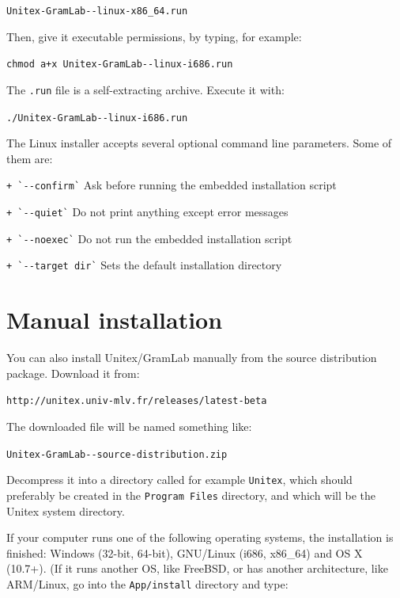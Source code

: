 {\tt Unitex-GramLab-\UnitexVersion{}-linux-x86\_64.run}

\noindent Then, give it executable permissions, by typing, for example:

{\tt chmod a+x Unitex-GramLab-\UnitexVersion{}-linux-i686.run}

\noindent The \verb+.run+ file is a self-extracting archive. Execute it with:

{\tt ./Unitex-GramLab-\UnitexVersion{}-linux-i686.run}

\noindent The Linux installer accepts several optional command line parameters. Some of them are:

\verb|+ `--confirm`|       \hspace{.15in} Ask before running the embedded installation script

\verb|+ `--quiet`|          \hspace{.15in} Do not print anything except error messages

\verb|+ `--noexec`|      \hspace{.15in} Do not run the embedded installation script

\verb|+ `--target dir`|   \hspace{.15in} Sets the default installation directory

\section{Manual installation}
You can also install Unitex/GramLab manually from the source distribution package. Download it from:

\verb+http://unitex.univ-mlv.fr/releases/latest-beta+

\noindent The downloaded file will be named something like:

{\tt Unitex-GramLab-\UnitexVersion{}-source-distribution.zip}

\noindent Decompress it into a directory called for example {\tt Unitex\UnitexVersion{}}, which
should preferably be created in the \verb+Program Files+ directory,
and which will be the Unitex system directory.

\bigskip
\noindent If your computer runs one of the following operating systems, the installation is finished: Windows (32-bit, 64-bit), GNU/Linux (i686, x86\_64) and OS X (10.7+). (If it runs another OS, like FreeBSD, or has another architecture, like ARM/Linux, go into the \verb+App/install+ directory and type:

